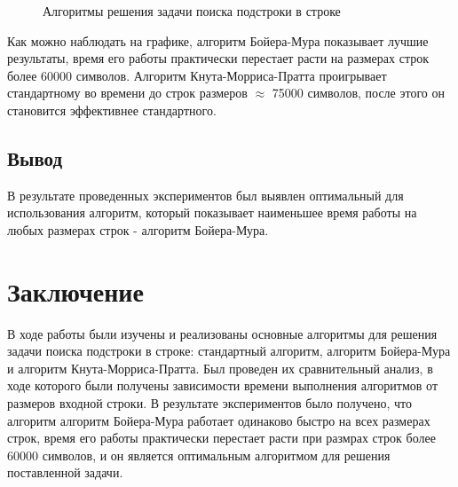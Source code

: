 \documentclass[a4paper,12pt]{report}
\begin{document}
\begin{figure}[ht!]
\begin{center}
\caption{Алгоритмы решения задачи поиска подстроки в строке}
\end{center}
\end{figure}

Как можно наблюдать на графике, алгоритм Бойера-Мура показывает лучшие результаты, время его работы практически перестает расти на размерах строк более 60000 символов. Алгоритм Кнута-Морриса-Пратта проигрывает стандартному во времени до строк размеров $\approx$ 75000 символов, после этого он становится эффективнее стандартного.
\section{Вывод}
\hspace{0.6cm}В результате проведенных экспериментов был выявлен оптимальный для использования алгоритм, который показывает наименьшее время работы на любых размерах строк - алгоритм Бойера-Мура.

\newpage

\chapter*{Заключение}
\hspace{0.6cm}В ходе работы были изучены и реализованы основные алгоритмы для решения задачи поиска подстроки в строке: стандартный алгоритм, алгоритм Бойера-Мура и алгоритм Кнута-Морриса-Пратта. Был проведен их сравнительный анализ, в ходе которого были получены зависимости времени выполнения алгоритмов от размеров входной строки. В результате экспериментов было получено, что алгоритм алгоритм Бойера-Мура работает одинаково быстро на всех размерах строк, время его работы практически перестает расти при размрах строк более 60000 символов, и он является оптимальным алгоритмом для решения поставленной задачи.
  
\end{document}
